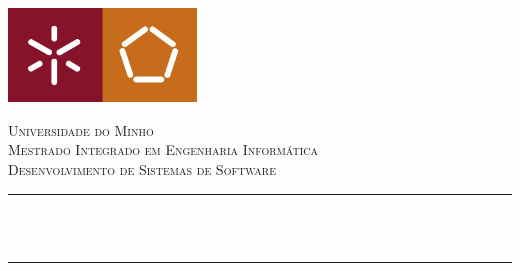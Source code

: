 \begin{titlepage}

\newcommand{\HRule}{\rule{\linewidth}{0.5mm}} %

\begin{center}
    \includegraphics[width=5cm]{title/logoEEUM.jpg}\\[1cm] %
\end{center}

\center %


\textsc{\LARGE Universidade do Minho}\\[1.5cm] %
\textsc{\Large Mestrado Integrado em Engenharia Informática}\\[0.5cm] %
\textsc{\large Desenvolvimento de Sistemas de Software}\\[1.1cm] %

\makeatletter
\HRule \\[0.4cm]
{ \huge \bfseries \@title}\\[0.1cm] %
\HRule \\[1.5cm]
 


\end{titlepage}

